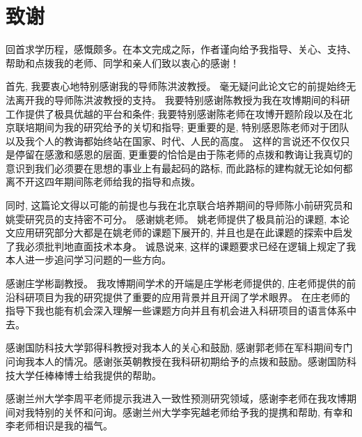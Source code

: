 \chapter[致谢]{致\quad 谢}%

回首求学历程，感慨颇多。在本文完成之际，作者谨向给予我指导、关心、支持、帮助和点拨我的老师、同学和亲人们致以衷心的感谢！

首先, 我要衷心地特别感谢我的导师陈洪波教授。 毫无疑问此论文它的前提始终无法离开我的导师陈洪波教授的支持。 我要特别感谢陈教授为我在攻博期间的科研工作提供了极具优越的平台和条件; 我要特别感谢陈老师在攻博开题阶段以及在北京联培期间为我的研究给予的关切和指导; 更重要的是, 特别感恩陈老师对于团队以及我个人的教诲都始终站在国家、时代、人民的高度。 这样的言说还不仅仅只是停留在感激和感恩的层面, 更重要的恰恰是由于陈老师的点拨和教诲让我真切的意识到我们必须要在思想的事业上有最起码的路标, 而此路标的建构就无论如何都离不开这四年期间陈老师给我的指导和点拨。 

同时, 这篇论文得以可能的前提也与我在北京联合培养期间的导师陈小前研究员和姚雯研究员的支持密不可分。 感谢姚老师。 姚老师提供了极具前沿的课题, 本论文应用研究部分大都是在姚老师的课题下展开的, 并且也是在此课题的探索中启发了我必须批判地直面技术本身。 诚恳说来, 这样的课题要求已经在逻辑上规定了我本人进一步追问学习问题的一些方向。

感谢庄学彬副教授。 我攻博期间学术的开端是庄学彬老师提供的, 庄老师提供的前沿科研项目为我的研究提供了重要的应用背景并且开阔了学术眼界。 在庄老师的指导下我也能有机会深入理解一些课题方向并且有机会进入科研项目的语言体系中去。

感谢国防科技大学郭得科教授对我本人的关心和鼓励, 感谢郭老师在军科期间专门问询我本人的情况。感谢张英朝教授在我科研初期给予的点拨和鼓励。感谢国防科技大学任棒棒博士给我提供的帮助。

感谢兰州大学李周平老师提示我进入一致性预测研究领域，感谢李老师在我攻博期间对我特别的关怀和问询。感谢兰州大学李宪越老师给予我的提携和帮助, 有幸和李老师相识是我的福气。

